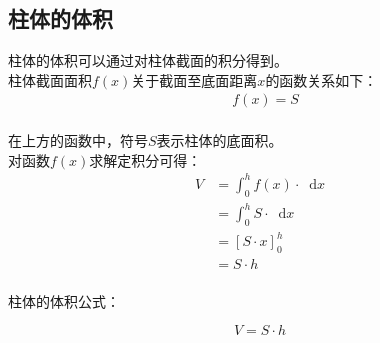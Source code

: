 \documentclass[UTF8]{ctexart}
\newcommand*{\dif}{\mathop{}\!\mathrm{d}}
\begin{document}
\newpage

\subsection{柱体的体积}
    柱体的体积可以通过对柱体截面的积分得到。\\[3mm]
    柱体截面面积$f(x)$关于截面至底面距离$x$的函数关系如下：
    \setcounter{equation}{0}
    \begin{align}
        &f(x)=S
    \end{align}\\
    在上方的函数中，符号$S$表示柱体的底面积。\\[8mm]
    对函数$f(x)$求解定积分可得：
    \begin{align}
        V
        &=\int_0^h f(x)\cdot\dif x\\[4mm]
        &=\int_0^h S\cdot\dif x\\[4mm]
        &=[S\cdot x]_0^h\\[4mm]
        &=S\cdot h
    \end{align}\\
    柱体的体积公式：
    \begin{large}
        \begin{equation*}
            V=S\cdot h
        \end{equation*}
    \end{large}

\newpage
\end{document}
